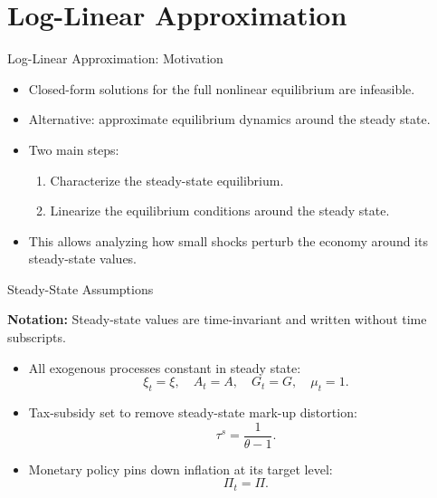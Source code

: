 \documentclass[11pt,aspectratio=169]{beamer}
\begin{document}
\section{Log-Linear Approximation}
\begin{frame}[label=LogLinearIntro]{Log-Linear Approximation: Motivation}
\small

\begin{itemize}
  \item Closed-form solutions for the full nonlinear equilibrium are infeasible.
  \item Alternative: approximate equilibrium dynamics around the steady state.
  \item Two main steps:
  \begin{enumerate}
      \item Characterize the steady-state equilibrium.
      \item Linearize the equilibrium conditions around the steady state.
  \end{enumerate}
  \item This allows analyzing how small shocks perturb the economy around its steady-state values.
\end{itemize}
\end{frame}


\begin{frame}[label=SteadyState]{Steady-State Assumptions}
\small

\textbf{Notation:} Steady-state values are time-invariant and written without time subscripts.

\begin{itemize}
  \item All exogenous processes constant in steady state:
  \[
      \xi_t=\xi,\quad A_t=A,\quad G_t=G,\quad \mu_t=1.
  \]
  \item Tax-subsidy set to remove steady-state mark-up distortion:
  \[
      \tau^s = \frac{1}{\theta - 1}.
  \]
\item Monetary policy pins down inflation at its target level:
  \[
      \Pi_t = \Pi.
  \]
\end{itemize}

\end{frame}
\end{document}
